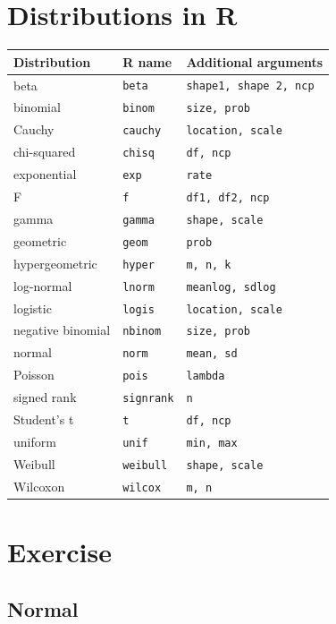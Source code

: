 \documentclass[
]{book}
\begin{document}
\hypertarget{distributions-in-r}{%
\section{Distributions in R}\label{distributions-in-r}}

\begin{longtable}[]{@{}lll@{}}
\toprule
Distribution & R name & Additional arguments \\
\midrule
\endhead
beta & \texttt{beta} & \texttt{shape1,\ shape\ 2,\ ncp} \\
binomial & \texttt{binom} & \texttt{size,\ prob} \\
Cauchy & \texttt{cauchy} & \texttt{location,\ scale} \\
chi-squared & \texttt{chisq} & \texttt{df,\ ncp} \\
exponential & \texttt{exp} & \texttt{rate} \\
F & \texttt{f} & \texttt{df1,\ df2,\ ncp} \\
gamma & \texttt{gamma} & \texttt{shape,\ scale} \\
geometric & \texttt{geom} & \texttt{prob} \\
hypergeometric & \texttt{hyper} & \texttt{m,\ n,\ k} \\
log-normal & \texttt{lnorm} & \texttt{meanlog,\ sdlog} \\
logistic & \texttt{logis} & \texttt{location,\ scale} \\
negative binomial & \texttt{nbinom} & \texttt{size,\ prob} \\
normal & \texttt{norm} & \texttt{mean,\ sd} \\
Poisson & \texttt{pois} & \texttt{lambda} \\
signed rank & \texttt{signrank} & \texttt{n} \\
Student's t & \texttt{t} & \texttt{df,\ ncp} \\
uniform & \texttt{unif} & \texttt{min,\ max} \\
Weibull & \texttt{weibull} & \texttt{shape,\ scale} \\
Wilcoxon & \texttt{wilcox} & \texttt{m,\ n} \\
\bottomrule
\end{longtable}

\hypertarget{exercise}{%
\section{Exercise}\label{exercise}}

\hypertarget{normal}{%
\subsection{Normal}\label{normal}}
\end{document}
